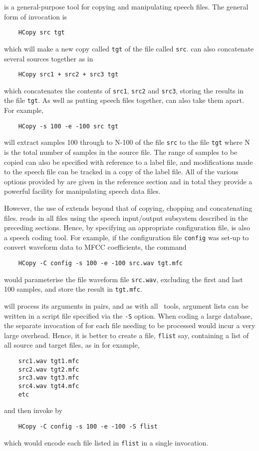 
 is a general-purpose tool 
for copying and manipulating speech files.
The general form of invocation is
\begin{verbatim}
    HCopy src tgt
\end{verbatim}
which will make a new copy called \texttt{tgt} of the file called \texttt{src}.
 can also concatenate several sources together as in 
\begin{verbatim}
    HCopy src1 + src2 + src3 tgt    
\end{verbatim}
which concatenates the contents of \texttt{src1}, \texttt{src2} and \texttt{src3},
storing the results in the file \texttt{tgt}.  As well as putting speech files
together,  can also take them apart.  For example,
\begin{verbatim}
    HCopy -s 100 -e -100 src tgt
\end{verbatim}
will extract samples 100 through to N-100 of the file \texttt{src} to the file
\texttt{tgt} where N is the total number of samples in the source file.
The range of samples to be copied can also be specified with reference to
a label file, and modifications made to the speech file can be tracked in a 
copy of the label file.  All of the various options provided by  
are given in the reference section and in total they provide a powerful
facility for manipulating speech data files.

However, the use of  extends beyond that of copying, chopping
and concatenating files.   reads in all files using the speech 
input/output subsystem described in the preceding sections.  Hence, by specifying
an appropriate configuration file,  is also a speech coding tool.
For example, if the configuration file \texttt{config} was set-up to convert
waveform data to MFCC coefficients, the command
\begin{verbatim}
    HCopy -C config -s 100 -e -100 src.wav tgt.mfc
\end{verbatim}
would parameterise the file waveform file \texttt{src.wav}, excluding the
first and last 100 samples, and store the result in \texttt{tgt.mfc}.

 will process its arguments in pairs, and as with all \HTK\ tools,
argument lists can be written in a script file specified via the \texttt{-S}
option.  When coding a large database, the separate invocation of  
for each file needing to be processed would incur a very large overhead.  Hence,
it is better to create a file, \texttt{flist} say, containing a list of
all source and target files, as in for example,
\begin{verbatim}
    src1.wav tgt1.mfc
    src2.wav tgt2.mfc
    src3.wav tgt3.mfc
    src4.wav tgt4.mfc
    etc
\end{verbatim}
and then invoke  by
\begin{verbatim}
    HCopy -C config -s 100 -e -100 -S flist
\end{verbatim}
which would encode each file listed in \texttt{flist} in a single invocation.


